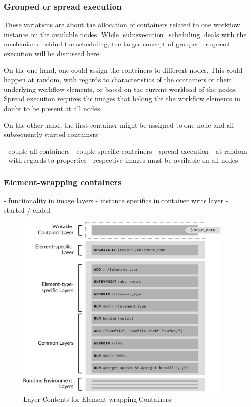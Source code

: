   \subsubsection{Grouped or spread execution} %
  \label{ssub:grouped_or_spread_execution}
    These variations are about the allocation of containers related to one workflow instance on the available nodes. While \ref{sub:execution_scheduling} deals with the mechanisms behind the scheduling, the larger concept of grouped or spread execution will be discussed here.

    On the one hand, one could assign the containers to different nodes. This could happen at random, with regards to characteristics of the containers or their underlying workflow elements, or based on the current workload of the nodes. Spread execution requires the images that belong the the workflow elements in doubt to be present at all nodes.

    On the other hand, the first container might be assigned to one node and all subsequently started containers


    - couple all containers
    - couple specific containers
    - spread execution
      - at random
      - with regards to properties
      - respective images must be available on all nodes

  \subsubsection{Element-wrapping containers} %
  \label{ssub:element_wrapping_containers}
    - functionality in image layers
    - instance specifics in container write layer
    - started / ended

    \begin{figure}[htbp]
      \centering
      \includegraphics[width=0.95\textwidth]{content/images/execution_container-crop.pdf}
      \caption{Layer Contents for Element-wrapping Containers}
      \label{fig:layers_for_element_wrapping_containers}
    \end{figure}

